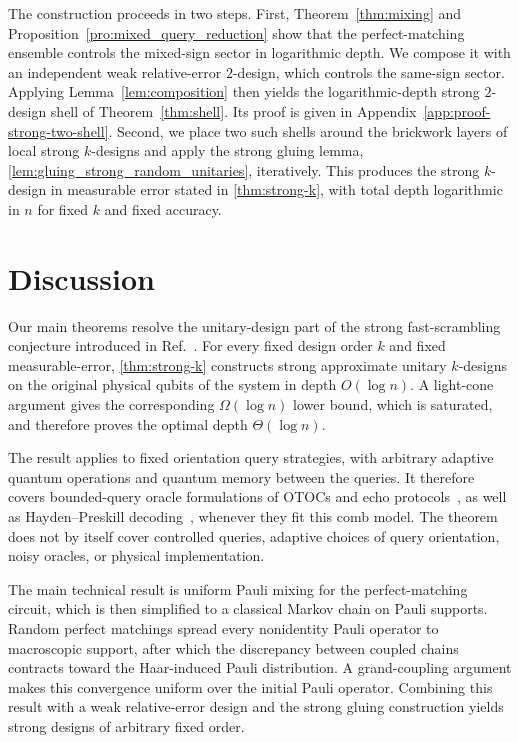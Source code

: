 \documentclass[
    aps,
    superscriptaddress,
    onecolumn,
    10pt,
    prx,
    nofootinbib
]{revtex4-2}
\theoremstyle{namedstatement}
\theoremstyle{plain}
\begin{document}
The construction proceeds in two steps. First, Theorem~\ref{thm:mixing} and Proposition~\ref{pro:mixed_query_reduction} show that the perfect-matching ensemble controls the mixed-sign sector in logarithmic depth. We compose it with an independent weak relative-error $2$-design, which controls the same-sign sector. Applying Lemma~\ref{lem:composition} then yields the logarithmic-depth strong $2$-design shell of Theorem~\ref{thm:shell}. Its proof is given in Appendix~\ref{app:proof-strong-two-shell}.
Second, we place two such shells around the brickwork layers of local strong $k$-designs and apply the strong gluing lemma, \cref{lem:gluing_strong_random_unitaries}, iteratively. This produces the strong $k$-design in measurable error stated in \cref{thm:strong-k}, with total depth logarithmic in $n$ for fixed $k$ and fixed accuracy.


\section{Discussion}
\label{sec:discussion}
Our main theorems resolve the unitary-design part of the strong fast-scrambling conjecture introduced in Ref.~\cite{SchusterEtAlStrong2025}. For every fixed design order $k$ and fixed measurable-error, \cref{thm:strong-k} constructs strong approximate unitary $k$-designs on the original physical qubits of the system in depth $O(\log n)$. A light-cone argument gives the corresponding $\Omega(\log n)$ lower bound, which is saturated, and therefore proves the optimal depth $\Theta(\log n)$.

The result applies to fixed orientation query strategies, with arbitrary adaptive quantum operations and quantum memory between the queries. It therefore covers bounded-query oracle formulations of OTOCs and echo protocols~\cite{LarkinOvchinnikov1969,Kitaev2015,RobertsStanford2015,SwingleEtAl2016,GarttnerEtAl2017}, as well as Hayden--Preskill decoding~\cite{HaydenPreskill2007,YoshidaKitaev2017}, whenever they fit this comb model. The theorem does not by itself cover controlled queries, adaptive choices of query orientation, noisy oracles, or physical implementation.

The main technical result is uniform Pauli mixing for the perfect-matching circuit, which is then simplified to a classical Markov chain on Pauli supports. Random perfect matchings spread every nonidentity Pauli operator to macroscopic support, after which the discrepancy between coupled chains contracts toward the Haar-induced Pauli distribution. A grand-coupling argument makes this convergence uniform over the initial Pauli operator.
Combining this result with a weak relative-error design and the strong gluing construction yields strong designs of arbitrary fixed order.
\end{document}
